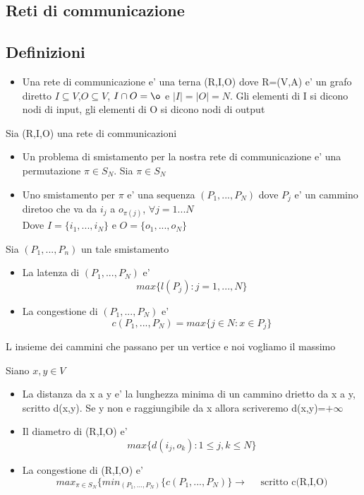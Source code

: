 \documentclass{article}
\begin{document}
        \subsection{Reti di communicazione}
        \subsection*{Definizioni}
        \begin{itemize}
          \item Una rete di communicazione e' una terna (R,I,O) dove R=(V,A) e' un grafo diretto
            $I \subseteq V$,$O\subseteq V$, $I \cap O =\o$ e $\mid I \mid =\mid O \mid=N$.
            Gli elementi di I si dicono nodi di input, gli elementi di O si dicono nodi di output
        \end{itemize}
        Sia (R,I,O) una rete di communicazioni
        \begin{itemize}
          \item Un problema di smistamento per la nostra rete di communicazione e' una permutazione $\pi \in S_N$. Sia $\pi \in S_N$
          \item Uno smistamento per $\pi$ e' una sequenza $(P_1,...,P_N)$ dove $P_j$ e' un cammino diretoo che va da $i_j$ a $o_{\pi(j)}$, $\forall j=1...N$ \\ 
            Dove $I=\{i_1,...,i_N\}$ e $O=\{o_1,...,o_N\}$
        \end{itemize}
        Sia $(P_1,...,P_n)$ un tale smistamento
        \begin{itemize}
          \item La latenza di $(P_1,...,P_N)$ e'
            \begin{equation*}
              max\{l(P_j):j=1,...,N\}
            \end{equation*}
          \item La congestione di $(P_1,...,P_N)$ e' 
            \begin{equation*}
              c(P_1,...,P_N)=max\{j\in N:x\in P_j\}
            \end{equation*}
        \end{itemize}
        \begin{flushleft}
          L insieme dei cammini che passano per un vertice e noi vogliamo il massimo
        \end{flushleft}
        Siano $x,y \in V$
        \begin{itemize}
          \item La distanza da x a y e' la lunghezza minima di un cammino drietto da x a y, scritto d(x,y). Se y non e raggiungibile da x allora scriveremo d(x,y)=$+\infty$
          \item Il diametro di (R,I,O) e'
            \begin{equation*}
              max\{d(i_j,o_k): 1\leq j,k\leq N\} 
            \end{equation*}
          \item La congestione di (R,I,O) e'
            \begin{equation*}
              max_{\pi \in S_N}\{min_{(P_1,...,P_N)}\{c(P_1,...,P_N)\} \to \quad \text{ scritto c(R,I,O)}
            \end{equation*}
        \end{itemize}
\end{document}
